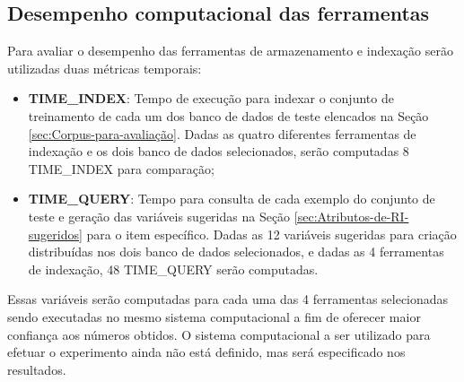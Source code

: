     \subsection{Desempenho computacional das ferramentas}  \label{subsec:Desempenho-computacional}
        Para avaliar o desempenho das ferramentas de armazenamento e indexação serão utilizadas duas métricas temporais:
        \begin{itemize}
            \item \textbf{TIME\_INDEX}: Tempo de execução para indexar o conjunto de treinamento de cada um dos banco de dados de teste elencados na Seção \ref{sec:Corpus-para-avaliação}. Dadas as quatro diferentes ferramentas de indexação e os dois banco de dados selecionados, serão computadas 8 TIME\_INDEX para comparação;
            
            \item \textbf{TIME\_QUERY}: Tempo para consulta de cada exemplo do conjunto de teste e geração das variáveis sugeridas na Seção \ref{sec:Atributos-de-RI-sugeridos} para o item específico. Dadas as 12 variáveis sugeridas para criação distribuídas nos dois banco de dados selecionados, e dadas as 4 ferramentas de indexação, 48 TIME\_QUERY serão computadas.  
        \end{itemize}
        
        Essas variáveis serão computadas para cada uma das 4 ferramentas selecionadas sendo executadas no mesmo sistema computacional a fim de oferecer maior confiança aos números obtidos. 
        O sistema computacional a ser utilizado para efetuar o experimento ainda não está definido, mas será especificado nos resultados.
    

